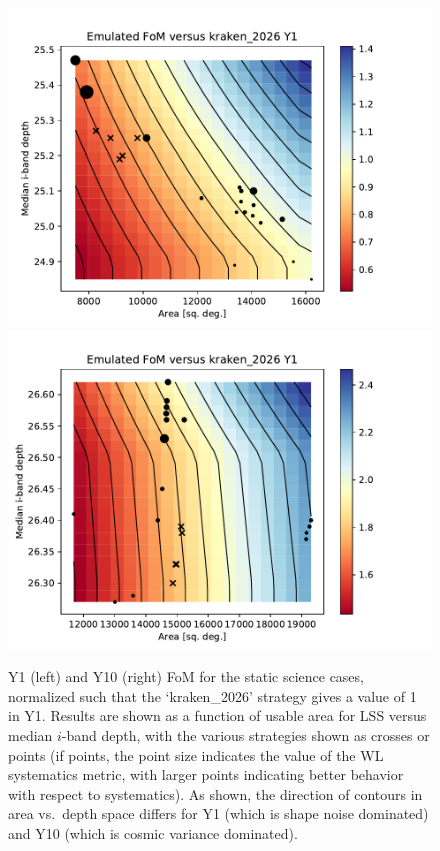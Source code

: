 \documentclass[a4paper,10pt]{article}
\begin{document}
\begin{figure}{\columnwidth}
\centering
 \includegraphics[width=0.45\columnwidth]{test_noprior_Y1_contour.pdf}
 \includegraphics[width=0.45\columnwidth]{test_noprior_Y10_contour.pdf}
\caption{Y1 (left) and Y10 (right) FoM for the static science cases, normalized such that the
 `kraken\_2026' strategy gives a value of 1 in Y1.  Results are shown as a function of usable area
 for LSS versus median $i$-band depth, with the various strategies shown as crosses or points (if
 points, the point size indicates the value of the WL systematics metric, with larger points
 indicating better behavior with respect to systematics). As shown, the direction of contours in
 area vs.\ depth space differs for Y1 (which is shape noise dominated) and Y10 (which is cosmic
 variance dominated).\label{fig:static_fom}}
\end{figure}
\end{document}
